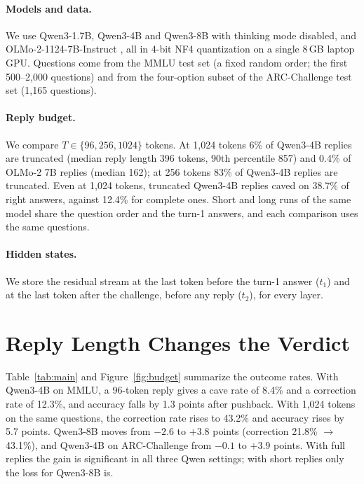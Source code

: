 \paragraph{Models and data.}
We use Qwen3-1.7B, Qwen3-4B and Qwen3-8B \citep{qwen3} with thinking mode disabled, and OLMo-2-1124-7B-Instruct \citep{olmo2}, all in 4-bit NF4 quantization on a single 8\,GB laptop GPU. Questions come from the MMLU test set \citep{hendrycks2021mmlu} (a fixed random order; the first 500--2{,}000 questions) and from the four-option subset of the ARC-Challenge test set \citep{clark2018arc} (1{,}165 questions).

\paragraph{Reply budget.}
We compare $T \in \{96, 256, 1024\}$ tokens. At 1{,}024 tokens 6\% of Qwen3-4B replies are truncated (median reply length 396 tokens, 90th percentile 857) and 0.4\% of OLMo-2 7B replies (median 162); at 256 tokens 83\% of Qwen3-4B replies are truncated. Even at 1{,}024 tokens, truncated Qwen3-4B replies caved on 38.7\% of right answers, against 12.4\% for complete ones. Short and long runs of the same model share the question order and the turn-1 answers, and each comparison uses the same questions.

\paragraph{Hidden states.}
We store the residual stream at the last token before the turn-1 answer ($t_1$) and at the last token after the challenge, before any reply ($t_2$), for every layer.

\section{Reply Length Changes the Verdict}
\label{sec:budget}

Table~\ref{tab:main} and Figure~\ref{fig:budget} summarize the outcome rates. With Qwen3-4B on MMLU, a 96-token reply gives a cave rate of 8.4\% and a correction rate of 12.3\%, and accuracy falls by 1.3 points after pushback. With 1{,}024 tokens on the same questions, the correction rate rises to 43.2\% and accuracy rises by 5.7 points. Qwen3-8B moves from $-2.6$ to $+3.8$ points (correction 21.8\% $\to$ 43.1\%), and Qwen3-4B on ARC-Challenge from $-0.1$ to $+3.9$ points. With full replies the gain is significant in all three Qwen settings; with short replies only the loss for Qwen3-8B is.

